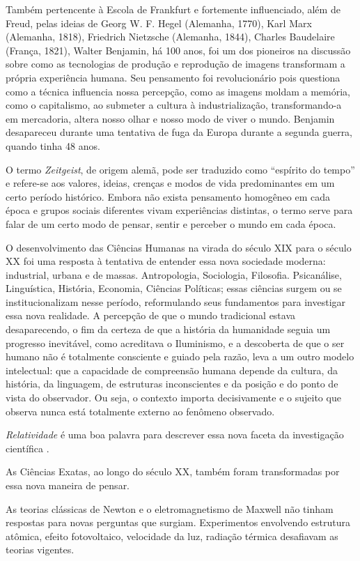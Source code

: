 \documentclass{hipatia}
\begin{document}
Também pertencente à Escola de Frankfurt e fortemente influenciado, além de Freud, pelas ideias de Georg W. F. Hegel (Alemanha, 1770), Karl Marx (Alemanha, 1818), Friedrich Nietzsche (Alemanha, 1844), Charles Baudelaire (França, 1821), Walter Benjamin, há 100 anos, foi um dos pioneiros na discussão sobre como as tecnologias de produção e reprodução de imagens transformam a própria experiência humana. Seu pensamento foi revolucionário pois questiona como a técnica influencia nossa percepção, como as imagens moldam a memória, como o capitalismo, ao submeter a cultura à industrialização, transformando-a em mercadoria, altera nosso olhar e nosso modo de viver o mundo. Benjamin desapareceu durante uma tentativa de fuga da Europa durante a segunda guerra, quando tinha 48 anos.

O termo \textit{Zeitgeist}, de origem alemã, pode ser traduzido como ``espírito do tempo'' e refere-se aos valores, ideias, crenças e modos de vida predominantes em um certo período histórico. Embora não exista pensamento homogêneo em cada época e grupos sociais diferentes vivam experiências distintas, o termo serve para falar de um certo modo de pensar, sentir e perceber o mundo em cada época. 

O desenvolvimento das Ciências Humanas na virada do século XIX para o século XX foi uma resposta à tentativa de entender essa nova sociedade moderna: industrial, urbana e de massas. Antropologia, Sociologia, Filosofia. Psicanálise, Linguística, História, Economia, Ciências Políticas; essas ciências surgem ou se institucionalizam nesse período, reformulando seus fundamentos para investigar essa nova realidade. A percepção de que o mundo tradicional estava desaparecendo, o fim da certeza de que a história da humanidade seguia um progresso inevitável, como acreditava o Iluminismo, e a descoberta de que o ser humano não é totalmente consciente e guiado pela razão, leva a um outro modelo intelectual: que a capacidade de compreensão humana depende da cultura, da história, da linguagem, de estruturas inconscientes e da posição e do ponto de vista do observador. Ou seja, o contexto importa decisivamente e o sujeito que observa nunca está totalmente externo ao fenômeno observado.

\textit{Relatividade} é uma boa palavra para descrever essa nova faceta da investigação científica \cite{Kuhn2017}.

As Ciências Exatas, ao longo do século XX, também foram transformadas por essa nova maneira de pensar.

As teorias clássicas de Newton e o eletromagnetismo de Maxwell não tinham respostas para novas perguntas que surgiam. Experimentos envolvendo estrutura atômica, efeito fotovoltaico, velocidade da luz, radiação térmica desafiavam as teorias vigentes. 
\end{document}
